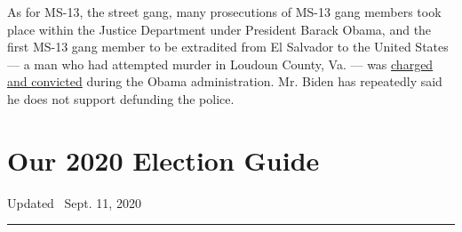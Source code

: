 As for MS-13, the street gang, many prosecutions of MS-13 gang members
took place within the Justice Department under President Barack Obama,
and the first MS-13 gang member to be extradited from El Salvador to the
United States --- a man who had attempted murder in Loudoun County, Va.
--- was
\href{https://slack-redir.net/link?url=https\%3A\%2F\%2Fwww.justice.gov\%2Fusao-edva\%2Fpr\%2Ffirst-ms-13-member-extradited-el-salvador-united-states-convicted-role-attempted-murder}{charged
and convicted} during the Obama administration. Mr. Biden has repeatedly
said he does not support defunding the police.

\hypertarget{our-2020-election-guide}{%
\section{Our 2020 Election Guide}\label{our-2020-election-guide}}

Updated ~Sept. 11, 2020

\begin{center}\rule{0.5\linewidth}{\linethickness}\end{center}

